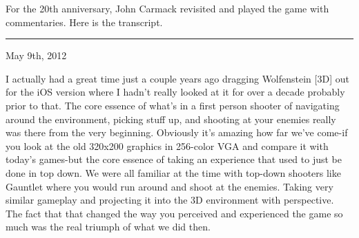 For the 20th anniversary, John Carmack revisited and played the game with commentaries. Here is the transcript.\\
\par
\hrule \par
\vspace{10pt}
May 9th, 2012\\ \par

I actually had a great time just a couple years ago dragging Wolfenstein [3D] out for the iOS version where I hadn't really looked at it for over a decade probably prior to that. The core essence of what's in a first person shooter of navigating around the environment, picking stuff up, and shooting at your enemies really was there from the very beginning. Obviously it's amazing how far we've come-if you look at the old 320x200 graphics in 256-color VGA and compare it with today's games-but the core essence of taking an experience that used to just be done in top down. We were all familiar at the time with top-down shooters like Gauntlet where you would run around and shoot at the enemies. Taking very similar gameplay and projecting it into the 3D environment with perspective. The fact that that changed the way you perceived and experienced the game so much was the real triumph of what we did then.\\ \par


